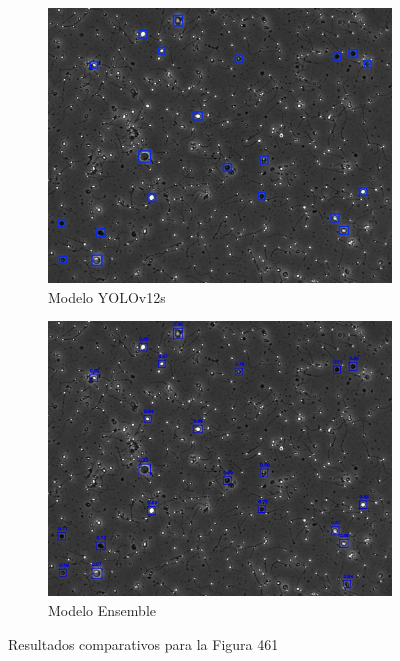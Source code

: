 \documentclass[12pt,a4paper,onecolumn,oneside]{report}
\begin{document}
\begin{figure}[H]
  \vspace{0.3cm} 
  
  \begin{subfigure}[b]{0.48\textwidth}
    \centering
    \includegraphics[width=\textwidth]{figuras/evaluacion_cualitativa/461/461_v12.jpg}
    \caption{Modelo YOLOv12s}
    \label{fig:yolov12s_image_461}
  \end{subfigure}
  \hfill
  \begin{subfigure}[b]{0.48\textwidth}
    \centering
    \includegraphics[width=\textwidth]{figuras/evaluacion_cualitativa/461/461_ensemble.jpg}
    \caption{Modelo Ensemble}
    \label{fig:ensemble_image_461}
  \end{subfigure}
  
  \caption{Resultados comparativos para la Figura 461}
  \label{fig:461}
\end{figure}
\end{document}
